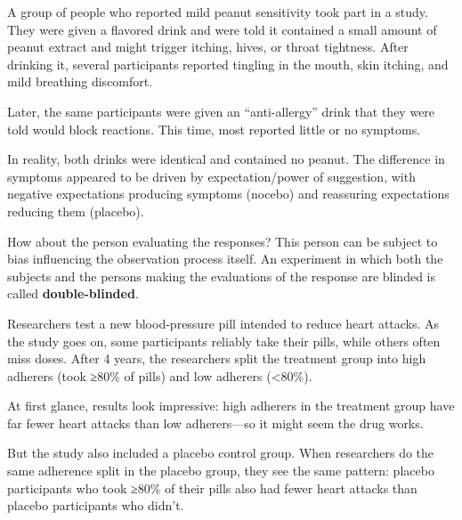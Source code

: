 \documentclass[
  letterpaper,
  DIV=11,
  numbers=noendperiod]{scrreprt}
\begin{document}
\begin{tcolorbox}[enhanced jigsaw, arc=.35mm, bottomrule=.15mm, bottomtitle=1mm, breakable, colback=white, colbacktitle=quarto-callout-note-color!10!white, colframe=quarto-callout-note-color-frame, coltitle=black, left=2mm, leftrule=.75mm, opacityback=0, opacitybacktitle=0.6, rightrule=.15mm, title={Example: Effect of drug on cats}, titlerule=0mm, toprule=.15mm, toptitle=1mm]

A group of people who reported mild peanut sensitivity took part in a
study. They were given a flavored drink and were told it contained a
small amount of peanut extract and might trigger itching, hives, or
throat tightness. After drinking it, several participants reported
tingling in the mouth, skin itching, and mild breathing discomfort.

Later, the same participants were given an ``anti-allergy'' drink that
they were told would block reactions. This time, most reported little or
no symptoms.

In reality, both drinks were identical and contained no peanut. The
difference in symptoms appeared to be driven by expectation/power of
suggestion, with negative expectations producing symptoms (nocebo) and
reassuring expectations reducing them (placebo).

\end{tcolorbox}

How about the person evaluating the responses? This person can be
subject to bias influencing the observation process itself. An
experiment in which both the subjects and the persons making the
evaluations of the response are blinded is called
\textbf{double-blinded}.

\begin{tcolorbox}[enhanced jigsaw, arc=.35mm, bottomrule=.15mm, bottomtitle=1mm, breakable, colback=white, colbacktitle=quarto-callout-note-color!10!white, colframe=quarto-callout-note-color-frame, coltitle=black, left=2mm, leftrule=.75mm, opacityback=0, opacitybacktitle=0.6, rightrule=.15mm, title={Example: ``Adherence effect'' in a blood-pressure trial (why you need a
control group)}, titlerule=0mm, toprule=.15mm, toptitle=1mm]

Researchers test a new blood-pressure pill intended to reduce heart
attacks. As the study goes on, some participants reliably take their
pills, while others often miss doses. After 4 years, the researchers
split the treatment group into high adherers (took ≥80\% of pills) and
low adherers (\textless80\%).

At first glance, results look impressive: high adherers in the treatment
group have far fewer heart attacks than low adherers---so it might seem
the drug works.

But the study also included a placebo control group. When researchers do
the same adherence split in the placebo group, they see the same
pattern: placebo participants who took ≥80\% of their pills also had
fewer heart attacks than placebo participants who didn't.

\end{tcolorbox}
\end{document}
